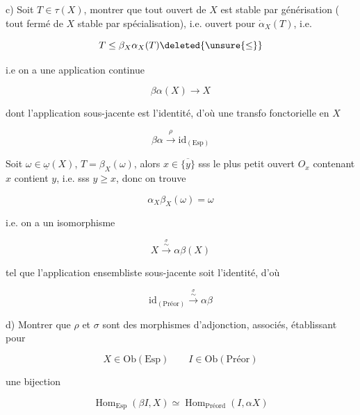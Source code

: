 
c) 
Soit $T\in\tau(X)$, montrer que  tout ouvert de $X$ est stable par générisation
( tout fermé de $X$ stable par spécialisation), i.e. ouvert pour $\dot\alpha_X(T)$, i.e.

\[
T\leq\beta_X\alpha_X(T)\deleted{\unsure{\leq}}
\]

i.e on a une application continue

\[
\beta\alpha(X)\longrightarrow X
\]

dont l'application sous-jacente est l'identité, d'où une transfo fonctorielle en $X$

\[
\beta\alpha\xrightarrow{\rho}\mathrm{id}_{(\mathrm{Esp})}
\]

Soit $\omega\in\underline\omega(X)$,  $T=\beta_X(\omega)$, alors $x\in\overline{\{y\}}$ sss
le plus petit ouvert $O_x$ contenant $x$ contient $y$, i.e. sss $y\geq x$, donc on trouve

\[
\alpha_X\beta_X(\omega)=\omega
\]

i.e. on a un isomorphisme

\[
X\xrightarrow{\overset{\sigma}{\sim}}\alpha\beta(X)
\]

tel que l'application ensembliste sous-jacente soit l'identité, d'où

\[
\mathrm{id}_{(\mathrm{Préor})}\xrightarrow{\overset{\sigma}{\sim}}\alpha\beta
\]

d) Montrer que $\rho$ et $\sigma$ sont des morphismes d'adjonction, associés,
établissant pour

\[
X\in\mathrm{Ob}(\mathrm{Esp})\qquad I\in\mathrm{Ob}(\mathrm{Préor})
\]

une bijection

\[
\operatorname{Hom}_{\mathrm{Esp}}(\beta I,X)\simeq\operatorname{Hom}_{\mathrm{Préord}}(I,\alpha X)\tag*{$(*)$}
\]



